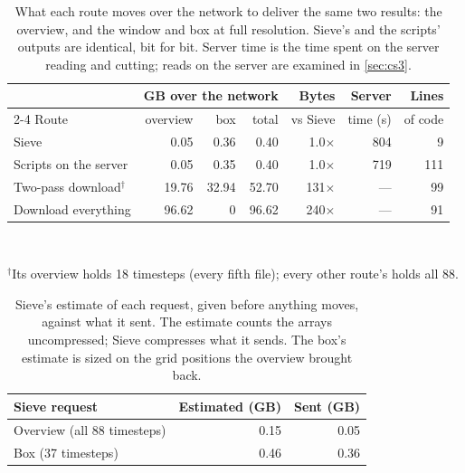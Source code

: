 \documentclass{vgtc}
\newcommand{\sname}{Sieve}
\newcommand{\Sname}{Sieve}
\begin{document}
\begin{table}[t]
  \centering
  \small
  \setlength{\tabcolsep}{3pt}
  \begin{tabular}{@{}lrrrrrr@{}}
    \toprule
     & \multicolumn{3}{c}{GB over the network} & Bytes & Server & Lines \\
    \cmidrule(lr){2-4}
    Route & overview & box & total & vs \Sname{} & time (s) & of code \\
    \midrule
    \Sname{}                     & 0.05  & 0.36  & 0.40  & 1.0$\times$ & 804 & 9 \\
    Scripts on the server        & 0.05  & 0.35  & 0.40  & 1.0$\times$ & 719 & 111 \\
    Two-pass download$^\dagger$  & 19.76 & 32.94 & 52.70 & 131$\times$ & --- & 99 \\
    Download everything          & 96.62 & 0     & 96.62 & 240$\times$ & --- & 91 \\
    \bottomrule
  \end{tabular}\\[2pt]
  \parbox{\columnwidth}{\footnotesize $^\dagger$Its overview holds 18 timesteps (every
  fifth file); every other route's holds all 88.}\par\vspace{3pt}
  \caption{What each route moves over the network to deliver the same two results: the
  overview, and the window and box at full resolution. \sname{}'s and the scripts' outputs
  are identical, bit for bit. Server time is the time spent on the server reading and
  cutting; reads on the server are examined in \cref{sec:cs3}.}
  \label{tab:cs2}
\end{table}

\begin{table}[t]
  \centering
  \small
  \begin{tabular}{@{}lrr@{}}
    \toprule
    \Sname{} request & Estimated (GB) & Sent (GB) \\
    \midrule
    Overview (all 88 timesteps)  & 0.15 & 0.05 \\
    Box (37 timesteps)           & 0.46 & 0.36 \\
    \bottomrule
  \end{tabular}
  \caption{\sname{}'s estimate of each request, given before anything moves, against what
  it sent. The estimate counts the arrays uncompressed; \sname{} compresses what it sends.
  The box's estimate is sized on the grid positions the overview brought back.}
  \label{tab:cs2est}
\end{table}
\end{document}
